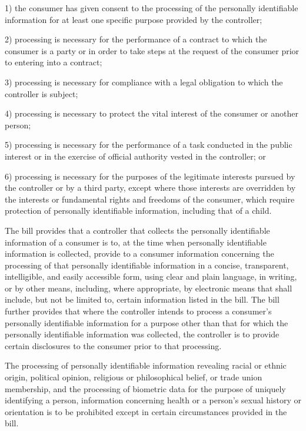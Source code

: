      1)    the consumer has given consent to the processing of the personally identifiable information for at least one specific purpose provided by the controller;

     2)    processing is necessary for the performance of a contract to which the consumer is a party or in order to take steps at the request of the consumer prior to entering into a contract;

     3)    processing is necessary for compliance with a legal obligation to which the controller is subject;

     4)    processing is necessary to protect the vital interest of the consumer or another person;

     5)    processing is necessary for the performance of a task conducted in the public interest or in the exercise of official authority vested in the controller; or

     6)    processing is necessary for the purposes of the legitimate interests pursued by the controller or by a third party, except where those interests are overridden by the interests or fundamental rights and freedoms of the consumer, which require protection of personally identifiable information, including that of a child.

     The bill provides that a controller that collects the personally identifiable information of a consumer is to, at the time when personally identifiable information is collected, provide to a consumer information concerning the processing of that personally identifiable information in a concise, transparent, intelligible, and easily accessible form, using clear and plain language, in writing, or by other means, including, where appropriate, by electronic means that shall include, but not be limited to, certain information listed in the bill. The bill further provides that where the controller intends to process a consumer's personally identifiable information for a purpose other than that for which the personally identifiable information was collected, the controller is to provide certain disclosures to the consumer prior to that processing.

     The processing of personally identifiable information revealing racial or ethnic origin, political opinion, religious or philosophical belief, or trade union membership, and the processing of biometric data for the purpose of uniquely identifying a person, information concerning health or a person's sexual history or orientation is to be prohibited except in certain circumstances provided in the bill.

